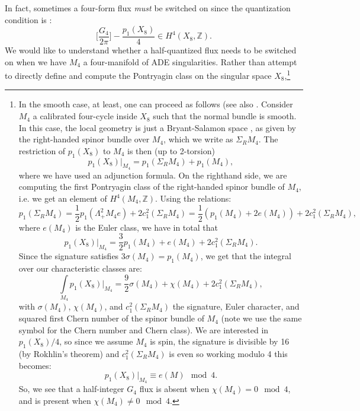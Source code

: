 \documentclass[12pt]{article}%
\numberwithin{equation}{section}
\renewcommand{\(}{\left(}
\renewcommand{\)}{\right)}
\renewcommand{\[}{\left[}
\renewcommand{\]}{\right]}
\begin{document}
In fact, sometimes a four-form flux \textit{must} be switched on
since the quantization condition is \cite{Witten:1996md}:
\begin{equation}
\bigg[\frac{G_4}{2\pi}\bigg]-\frac{p_1(X_8)}{4} \in H^4(X_8,\mathbb{Z}).
\end{equation}
We would like to understand whether a half-quantized
flux needs to be switched on when we have
$M_4$ a four-manifold of ADE singularities. Rather than attempt
to directly define and compute the Pontryagin class on the singular space $X_8$,\footnote{In the smooth case, at least,
one can proceed as follows (see also \cite{Gukov:2001hf}.
Consider $M_4$ a calibrated four-cycle inside $X_8$ such that the normal bundle is smooth.
In this case, the local geometry is just a Bryant-Salamon space \cite{bryant1989}, as given by the right-handed spinor bundle over $M_4$, which
we write as $\Sigma_R M_4$. The restriction of $p_1(X_8)$ to $M_4$ is then (up to 2-torsion)
\begin{equation}
p_1(X_8)|_{M_4}= p_1(\Sigma_R M_4) + p_1(M_4),
\end{equation}
where we have used an adjunction formula. On the righthand side, we are computing the
first Pontryagin class of the right-handed spinor bundle of $M_4$, i.e.
we get an element of $H^{4}(M_4, \mathbb{Z})$. Using the relations:
\begin{equation}\label{eqn:X8X7}
p_1(\Sigma_R M_4)=\frac{1}{2}p_1(\Lambda^2_{+}M_4e)+2c_1^2(\Sigma_R M_4)=\frac{1}{2}(p_1(M_4)+2 e(M_4))+2c_1^2(\Sigma_R M_4),
\end{equation}
where $e(M_4)$ is the Euler class, we have in total that
\begin{equation}
p_1(X_8)|_{M_4}=\frac{3}{2}p_1(M_4)+e(M_4)+2c_1^2(\Sigma_R M_4).
\end{equation}
Since the signature satisfies $3 \sigma(M_4) = p_{1}(M_4)$, we get that the integral over our characteristic classes are:
\begin{equation}
\underset{M_4}{\int} p_1(X_8)|_{M_4} = \frac{9}{2} \sigma(M_4) + \chi(M_4)+2c_1^2(\Sigma_R M_4),
\end{equation}
with $\sigma(M_4)$, $\chi(M_4)$, and $c_1^2(\Sigma_R M_4)$ the signature, Euler character, and squared first Chern number of the spinor bundle of $M_4$ (note we use the same symbol for the Chern number and Chern class). We are interested in $p_1(X_8)/4$, so since we assume $M_4$ is spin, the signature is divisible by 16 (by Rokhlin's theorem) and $c^2_1(\Sigma_R M_4)$ is even so working modulo 4 this becomes:
\begin{equation}
p_1(X_8)|_{M_4}\equiv e(M) \mod 4.
\end{equation}
So, we see that a half-integer $G_4$ flux is absent when $\chi(M_4)=0 \mod 4 $, and is present when
$\chi(M_4) \neq 0 \mod 4 $.}
\end{document}
